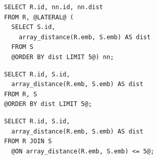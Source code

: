 \begin{table}[t]
    \begin{minipage}[c]{\dimexpr\textwidth-1.2em\relax}
        \begin{tcbraster}[raster columns=3, raster equal height=rows, raster before skip=0pt, raster after skip=0pt]
            \begin{tcolorbox}[vjcard, vjmode=vjperrow]
                \begin{lstlisting}[style=vj,label={lst:sql-per-row}]
SELECT R.id, nn.id, nn.dist
FROM R, @LATERAL@ (
  SELECT S.id,
    array_distance(R.emb, S.emb) AS dist
  FROM S
  @ORDER BY dist LIMIT 5@) nn;
\end{lstlisting}
            \end{tcolorbox}
            \begin{tcolorbox}[vjcard, vjmode=vjglobal]
                \begin{lstlisting}[style=vj,label={lst:sql-global}]
SELECT R.id, S.id,
  array_distance(R.emb, S.emb) AS dist
FROM R, S
@ORDER BY dist LIMIT 5@;
\end{lstlisting}
            \end{tcolorbox}
            \begin{tcolorbox}[vjcard, vjmode=vjthresh]
                \begin{lstlisting}[style=vj,label={lst:sql-threshold}]
SELECT R.id, S.id,
  array_distance(R.emb, S.emb) AS dist
FROM R JOIN S
  @ON array_distance(R.emb, S.emb) <= 5@;
\end{lstlisting}
            \end{tcolorbox}
        \end{tcbraster}
    \end{minipage}
    \vjrule{\heavyrulewidth}
\end{table}
